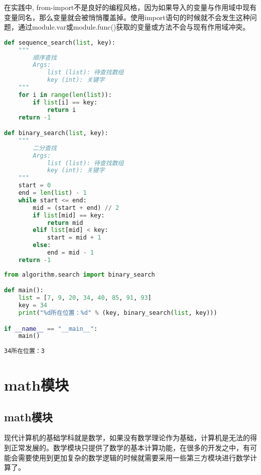 在实践中, from-import不是良好的编程风格，因为如果导入的变量与作用域中现有变量同名，那么变量就会被悄悄覆盖掉。使用import语句的时候就不会发生这种问题，通过module.var或module.func()获取的变量或方法不会与现有作用域冲突。\\


\begin{lstlisting}[language=Python, title=algorithm/search.py]
def sequence_search(list, key):
    """
        顺序查找
        Args:
            list (list): 待查找数组
            key (int): 关键字
    """
    for i in range(len(list)):
        if list[i] == key:
            return i
    return -1

def binary_search(list, key):
    """
        二分查找
        Args:
            list (list): 待查找数组
            key (int): 关键字
    """
    start = 0
    end = len(list) - 1
    while start <= end:
        mid = (start + end) // 2
        if list[mid] == key:
            return mid
        elif list[mid] < key:
            start = mid + 1
        else:
            end = mid - 1
    return -1
\end{lstlisting}

\begin{lstlisting}[language=Python, title=from\_import.py]
from algorithm.search import binary_search

def main():
    list = [7, 9, 20, 34, 40, 85, 91, 93]
    key = 34
    print("%d所在位置：%d" % (key, binary_search(list, key)))

if __name__ == "__main__":
    main()
\end{lstlisting}

\begin{tcolorbox}
	\begin{verbatim}
34所在位置：3
\end{verbatim}
\end{tcolorbox}

\newpage

\section{math模块}

\subsection{math模块}

现代计算机的基础学科就是数学，如果没有数学理论作为基础，计算机是无法的得到正常发展的。数学模块只提供了数学的基本计算功能，在很多的开发之中，有可能会需要使用到更加复杂的数学逻辑的时候就需要采用一些第三方模块进行数学计算了。\\

